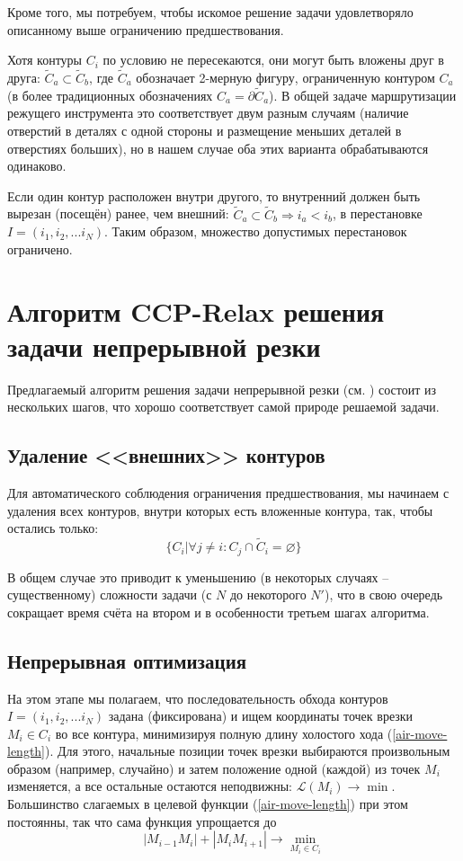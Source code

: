 \documentclass[10pt]{SPIIRAS_Proceedings}
\begin{document}
Кроме того,
мы потребуем,
чтобы искомое решение задачи
удовлетворяло
описанному выше
ограничению предшествования.

Хотя контуры
$C_i$
по условию не пересекаются,
они могут быть вложены друг в друга:
\( \tilde C_a \subset \tilde C_b \),
где
$\tilde C_a$
обозначает 2-мерную фигуру,
ограниченную контуром
$C_a$
(в более традиционных обозначениях
$C_a = \partial \tilde C_a$).
В общей задаче маршрутизации
режущего инструмента это
соответствует двум разным случаям
(наличие отверстий в деталях с одной стороны
и размещение меньших деталей в отверстиях больших),
но в нашем случае оба этих
варианта обрабатываются одинаково.

Если один контур расположен внутри другого,
то внутренний должен быть вырезан
(посещён)
ранее, чем внешний:
\( \tilde C_a \subset \tilde C_b \Rightarrow i_a < i_b \),
в перестановке
$I = (i_1, i_2, ... i_N)$.
Таким образом,
множество допустимых перестановок ограничено.

\section{Алгоритм CCP-Relax решения задачи непрерывной резки}
\label{sec:ccp-relax}

Предлагаемый алгоритм решения задачи непрерывной резки
(см. \cite{berlin2019})
состоит из нескольких шагов,
что хорошо соответствует самой природе
решаемой задачи.

\subsection{Удаление <<внешних>> контуров}

Для автоматического соблюдения
ограничения предшествования,
мы начинаем с удаления всех контуров,
внутри которых есть вложенные контура,
так, чтобы остались только:
$$
\{C_i | \forall j \ne i: C_j \cap \tilde C_i = \varnothing \}
$$

В общем случае это приводит к уменьшению
(в некоторых случаях -- существенному)
сложности задачи
(с $N$ до некоторого $N'$),
что в свою очередь
сокращает время счёта
на втором и в особенности третьем
шагах алгоритма.

\subsection{Непрерывная оптимизация}

На этом этапе мы полагаем,
что последовательность обхода контуров
$I = (i_1, i_2, ... i_N)$
задана (фиксирована)
и ищем координаты точек врезки
$M_i \in C_i$
во все контура,
минимизируя полную длину холостого хода
(\ref{air-move-length}).
Для этого,
начальные позиции точек врезки выбираются
произвольным образом
(например, случайно)
и затем положение одной (каждой) из точек
$M_i$
изменяется, а все остальные остаются неподвижны:
$\mathcal{L}(M_i) \to \min$.
Большинство слагаемых в целевой функции
(\ref{air-move-length})
при этом постоянны,
так что сама функция упрощается до
$$
|M_{i-1}M_i|+|M_iM_{i+1}| \to \min_{M_i \in C_i}
$$
\end{document}
